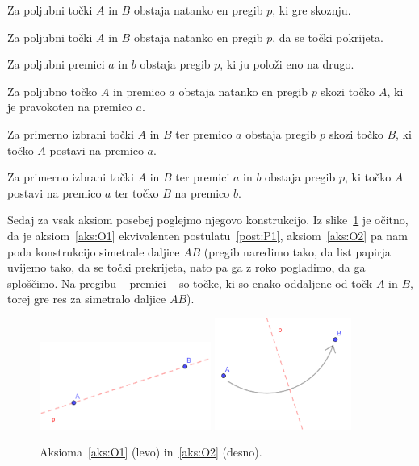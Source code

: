 \begin{aksiom}
    \label{aks:O1}
    Za poljubni točki $A$ in $B$ obstaja natanko en pregib $p$, ki gre skoznju.
\end{aksiom}
\begin{aksiom}
    \label{aks:O2}
    Za poljubni točki $A$ in $B$ obstaja natanko en pregib $p$, da se točki pokrijeta.
\end{aksiom}
\begin{aksiom}
    \label{aks:O3}
    Za poljubni premici $a$ in $b$ obstaja pregib $p$, ki ju položi eno na drugo.
\end{aksiom}
\begin{aksiom}
    \label{aks:O4}
    Za poljubno točko $A$ in premico $a$ obstaja natanko en pregib $p$ skozi točko $A$, ki je pravokoten na premico $a$.
\end{aksiom}
\begin{aksiom}
    \label{aks:O5}
    Za primerno izbrani točki $A$ in $B$ ter premico $a$ obstaja pregib $p$ skozi točko $B$, ki točko $A$ postavi na premico $a$.
\end{aksiom}
\begin{aksiom}
    \label{aks:O6}
    Za primerno izbrani točki $A$ in $B$ ter premici $a$ in $b$ obstaja pregib $p$, ki točko $A$ postavi na premico $a$ ter točko $B$ na premico $b$.
\end{aksiom}

Sedaj za vsak aksiom posebej poglejmo njegovo konstrukcijo. Iz slike~\ref{fig:O1_in_O2} je očitno, da je aksiom~\ref{aks:O1} ekvivalenten postulatu~\ref{post:P1}, aksiom~\ref{aks:O2} pa nam poda konstrukcijo simetrale daljice $AB$ (pregib naredimo tako, da list papirja uvijemo tako, da se točki prekrijeta, nato pa ga z roko pogladimo, da ga sploščimo. Na pregibu -- premici -- so točke, ki so enako oddaljene od točk $A$ in $B$, torej gre res za simetralo daljice $AB$).

\begin{figure}[h!]
    \centering
    \includegraphics[width=0.5\textwidth]{images/origami_aksiomi/O1.png}
    \includegraphics[width=0.4\textwidth]{images/origami_aksiomi/O2.png}
    \caption[Aksioma~\ref{aks:O1} in~\ref{aks:O2}]{Aksioma~\ref{aks:O1} (levo) in~\ref{aks:O2} (desno).}
    \label{fig:O1_in_O2}
\end{figure}

